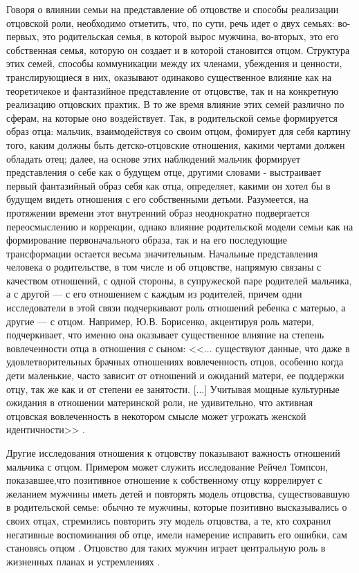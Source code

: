 \documentclass{../../common/thesisbyxetex}
\begin{document}
Говоря о влиянии семьи на представление об отцовстве и способы реализации отцовской роли,
необходимо отметить, что, по сути, речь идет о двух семьях: во-первых, это родительская семья, в
которой вырос мужчина, во-вторых, это его собственная семья, которую он создает и в которой
становится отцом. Структура этих семей, способы коммуникации между их членами, убеждения и
ценности, транслирующиеся в них, оказывают одинаково существенное влияние как на теоретичекое и
фантазийное представление от отцовстве, так и на конкретную реализацию отцовских практик. В то же
время влияние этих семей различно по сферам, на которые оно воздействует. Так, в родительской семье
формируется образ отца: мальчик, взаимодействуя со своим отцом, фомирует для себя картину того,
каким должны быть детско-отцовские отношения, какими чертами должен обладать отец; далее, на основе
этих наблюдений мальчик формирует представления о себе как о будущем отце, другими словами -
выстраивает первый фантазийный образ себя как отца, определяет, какими он хотел бы в будущем видеть
отношения с его собственными детьми. Разумеется, на протяжении времени этот внутренний образ
неоднократно подвергается переосмыслению и коррекции, однако влияние родительской модели семьи как
на формирование первоначального образа, так и на его последующие трансформации остается весьма
значительным.
Начальные представления человека о родительстве, в том числе и об отцовстве, напрямую связаны с
качеством отношений, с одной стороны, в
супружеской паре родителей мальчика, а с другой --- с его отношением с каждым из родителей, причем
одни исследователи в этой связи подчеркивают роль отношений ребенка с матерью, а другие --- с
отцом. Например, Ю.В. Борисенко, акцентируя роль матери, подчеркивает, что именно она оказывает
существенное влияние на степень вовлеченности отца в отношения с сыном: <<... существуют
данные, что даже в удовлетворительных брачных отношениях вовлеченность отцов, особенно когда дети
маленькие, часто зависит от отношений и ожиданий матери, ее поддержки отцу, так же как и от степени
ее занятости. [...]  Учитывая мощные культурные ожидания в отношении материнской роли, не
удивительно, что активная отцовская вовлеченность в некотором смысле может угрожать женской
идентичности>> \cite[115]{psyot}.

Другие исследования отношения к отцовству показывают важность отношений мальчика с
отцом. Примером может служить исследование Рейчел Томпсон, показавшее,что позитивное отношение к
собственному отцу коррелирует с желанием мужчины иметь детей и повторять модель отцовства,
существовавшую в родительской семье: обычно те мужчины, которые позитивно высказывались о
своих отцах, стремились повторить эту модель отцовства, а те, кто сохранил негативные
воспоминания об отце, имели намерение исправить его ошибки, сам становясь отцом  \cite[161]{imaf}.
Отцовство для таких мужчин играет центральную роль в жизненных
планах и устремлениях \cite{imaf}.
\end{document}

